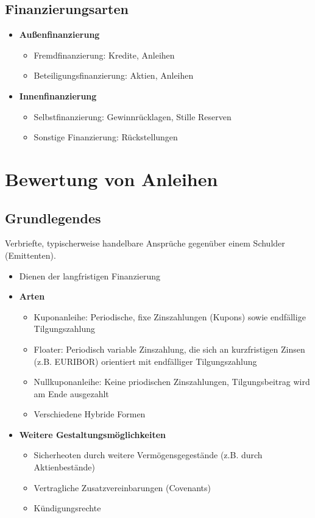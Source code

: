 \subsection{Finanzierungsarten}
\begin{itemize}
	\item \textbf{Außenfinanzierung}
	\begin{itemize}
		\item Fremdfinanzierung: Kredite, Anleihen
		\item Beteiligungsfinanzierung: Aktien, Anleihen
	\end{itemize}
	\item \textbf{Innenfinanzierung}
	\begin{itemize}
		\item Selbstfinanzierung: Gewinnrücklagen, Stille Reserven
		\item Sonstige Finanzierung: Rückstellungen
	\end{itemize}
\end{itemize}



\section{Bewertung von Anleihen}

\subsection{Grundlegendes}
Verbriefte, typischerweise handelbare Ansprüche gegenüber einem Schulder (Emittenten).
\begin{itemize}
	\item Dienen der langfristigen Finanzierung
	\item \textbf{Arten}
	\begin{itemize}
		\item Kuponanleihe: Periodische, fixe Zinszahlungen (Kupons) sowie endfällige Tilgungszahlung
		\item Floater: Periodisch variable Zinszahlung, die sich an kurzfristigen Zinsen (z.B. EURIBOR) orientiert mit endfälliger Tilgungszahlung
		\item Nullkuponanleihe: Keine priodischen Zinszahlungen, Tilgungsbeitrag wird am Ende ausgezahlt
		\item Verschiedene Hybride Formen
	\end{itemize}
	\item \textbf{Weitere Gestaltungsmöglichkeiten}
	\begin{itemize}
		\item Sicherheoten durch weitere Vermögensgegestände (z.B. durch Aktienbestände)
		\item Vertragliche Zusatzvereinbarungen (Covenants)
		\item Kündigungsrechte
	\end{itemize}
\end{itemize}


